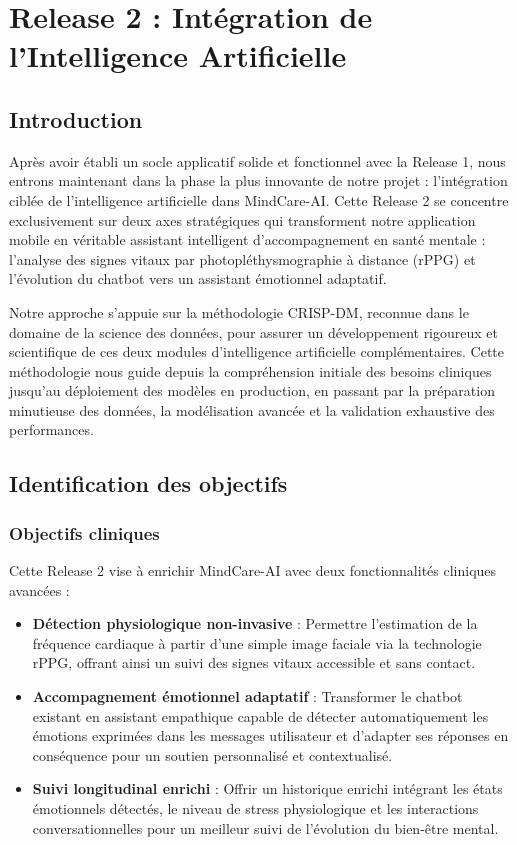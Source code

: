 \chapter{Release 2 : Intégration de l'Intelligence Artificielle}
\begingroup
{}
\localtableofcontents 
\endgroup
\newpage

\section{Introduction}
Après avoir établi un socle applicatif solide et fonctionnel avec la Release 1, nous entrons maintenant dans la phase la plus innovante de notre projet : l'intégration ciblée de l'intelligence artificielle dans MindCare-AI. Cette Release 2 se concentre exclusivement sur deux axes stratégiques qui transforment notre application mobile en véritable assistant intelligent d'accompagnement en santé mentale : l'analyse des signes vitaux par photopléthysmographie à distance (rPPG) et l'évolution du chatbot vers un assistant émotionnel adaptatif.

Notre approche s'appuie sur la méthodologie CRISP-DM, reconnue dans le domaine de la science des données, pour assurer un développement rigoureux et scientifique de ces deux modules d'intelligence artificielle complémentaires. Cette méthodologie nous guide depuis la compréhension initiale des besoins cliniques jusqu'au déploiement des modèles en production, en passant par la préparation minutieuse des données, la modélisation avancée et la validation exhaustive des performances.

\section{Identification des objectifs}

\subsection{Objectifs cliniques }
Cette Release 2 vise à enrichir MindCare-AI avec deux fonctionnalités cliniques avancées :
\begin{itemize}
    \item \textbf{Détection physiologique non-invasive} : Permettre l'estimation de la fréquence cardiaque à partir d'une simple image faciale via la technologie rPPG, offrant ainsi un suivi des signes vitaux accessible et sans contact.
    
    \item \textbf{Accompagnement émotionnel adaptatif} : Transformer le chatbot existant en assistant empathique capable de détecter automatiquement les émotions exprimées dans les messages utilisateur et d'adapter ses réponses en conséquence pour un soutien personnalisé et contextualisé.
      
    \item \textbf{Suivi longitudinal enrichi} : Offrir un historique enrichi intégrant les états émotionnels détectés, le niveau de stress physiologique et les interactions conversationnelles pour un meilleur suivi de l'évolution du bien-être mental.
\end{itemize}

